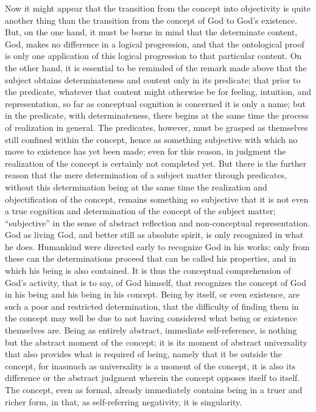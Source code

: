 Now it might appear that the transition
from the concept into objectivity
is quite another thing than the transition
from the concept of God to God's existence.
But, on the one hand, it must be borne in mind
that the determinate content, God,
makes no difference in a logical progression,
and that the ontological proof is
only one application of this logical progression
to that particular content.
On the other hand, it is essential to be
reminded of the remark made above that
the subject obtains determinateness
and content only in its predicate;
that prior to the predicate,
whatever that content might otherwise be for
feeling, intuition, and representation,
so far as conceptual cognition is concerned
it is only a name;
but in the predicate, with determinateness,
there begins at the same time
the process of realization in general.
The predicates, however, must be grasped as
themselves still confined within the concept,
hence as something subjective with which
no move to existence has yet been made;
even for this reason, in judgment the realization of
the concept is certainly not completed yet.
But there is the further reason that
the mere determination of a subject matter through predicates,
without this determination being at the same time
the realization and objectification of the concept,
remains something so subjective that it is not even
a true cognition and determination of the
concept of the subject matter;
“subjective” in the sense of abstract reflection
and non-conceptual representation.
God as living God, and better still as absolute spirit,
is only recognized in what he does.
Humankind were directed early to recognize God in his works;
only from these can the determinations proceed
that can be called his properties,
and in which his being is also contained.
It is thus the conceptual comprehension of God's activity,
that is to say, of God himself,
that recognizes the concept of God in his being
and his being in his concept.
Being by itself, or even existence,
are such a poor and restricted determination,
that the difficulty of finding them in the concept
may well be due to not having considered
what being or existence themselves are.
Being as entirely abstract, immediate self-reference,
is nothing but the abstract moment of the concept;
it is its moment of abstract universality
that also provides what is required of being,
namely that it be outside the concept,
for inasmuch as universality is a moment of the concept,
it is also its difference or the abstract judgment
wherein the concept opposes itself to itself.
The concept, even as formal, already immediately contains
being in a truer and richer form,
in that, as self-referring negativity,
it is singularity.

